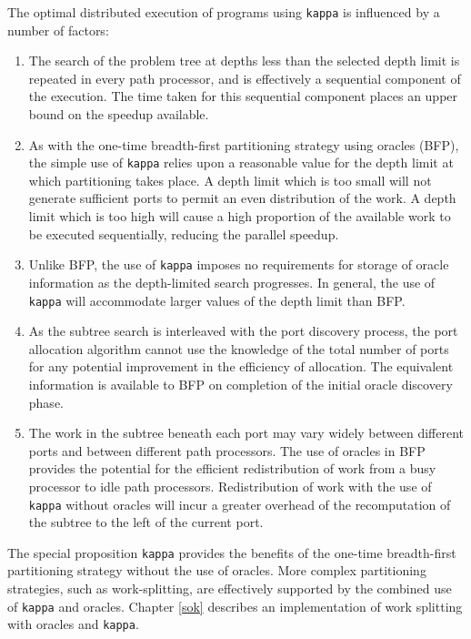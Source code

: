 The optimal distributed execution of programs using \texttt{kappa}
is influenced by a number of factors:
\begin{enumerate}
\item{The search of the problem tree at depths less than the selected depth limit is
  repeated in every path processor, and is effectively a sequential component of
  the execution.  The time taken for this sequential component places an upper bound
  on the speedup available.}
\item{As with the one-time breadth-first partitioning strategy using oracles (BFP),
  the simple use of \texttt{kappa} relies upon a reasonable value
  for the depth limit at which partitioning takes place.  A depth limit which is too
  small will not generate sufficient ports to permit an even distribution of the work.
  A depth limit which is too high will cause a high proportion of the available work to
  be executed sequentially, reducing the parallel speedup.}
\item{Unlike BFP, the use of \texttt{kappa} imposes no requirements for storage of
  oracle information as the depth-limited search progresses.  In general, the use of
  \texttt{kappa} will accommodate larger values of the depth limit than BFP.}
\item{As the subtree search is interleaved with the port discovery process, the port
  allocation algorithm cannot use the knowledge of the total number of ports for any
  potential improvement in the efficiency of allocation.  The equivalent information is
  available to BFP on completion of the initial oracle discovery phase.}
\item{The work in the subtree beneath each port may vary widely between different ports
  and between different path processors.
  The use of oracles in BFP provides the potential for the
  efficient redistribution of work from a busy processor to idle path processors.
  Redistribution of work with the use of \texttt{kappa} without oracles 
  will incur a greater overhead of
  the recomputation of the subtree to the left of the current port.}
\end{enumerate}
The special proposition \texttt{kappa} provides the benefits of the one-time
breadth-first partitioning strategy without the use of oracles.  More complex
partitioning strategies, such as work-splitting, are effectively supported 
by the combined use of \texttt{kappa} and oracles.  Chapter \ref{sok} describes
an implementation of work splitting with oracles and \texttt{kappa}.
